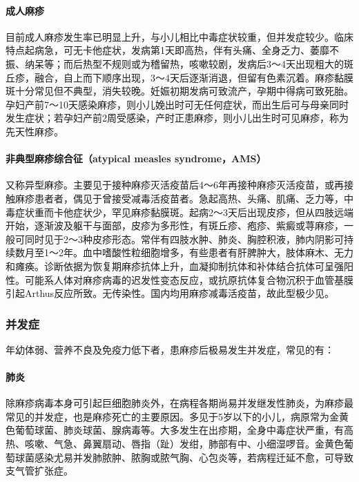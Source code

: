 \paragraph{成人麻疹}

目前成人麻疹发生率已明显上升，与小儿相比中毒症状较重，但并发症较少。临床特点起病急，可无卡他症状，发病第1天即高热，伴有头痛、全身乏力、萎靡不振、纳呆等；而后热型不规则或为稽留热，咳嗽较剧，发病后3～4天出现粗大的斑丘疹，融合，自上而下顺序出现，3～4天后逐渐消退，但留有色素沉着。麻疹黏膜斑十分常见但不典型，消失较晚。妊娠初期发病可致流产，孕期中得病可致死胎。孕妇产前7～10天感染麻疹，则小儿娩出时可无任何症状，而出生后可与母亲同时发生症状；若孕妇产前2周受感染，产时正患麻疹，则小儿出生时可见麻疹，称为先天性麻疹。

\paragraph{非典型麻疹综合征（atypical measles syndrome，AMS）}

又称异型麻疹。主要见于接种麻疹灭活疫苗后4～6年再接种麻疹灭活疫苗，或再接触麻疹患者者，偶见于曾接受减毒活疫苗者。急起高热、头痛、肌痛、乏力等，中毒症状重而卡他症状少，罕见麻疹黏膜斑。起病2～3天后出现皮疹，但从四肢远端开始，逐渐波及躯干与面部，皮疹为多形性，有斑丘疹、疱疹、紫癜或荨麻疹，一般可同时见于2～3种皮疹形态。常伴有四肢水肿、肺炎、胸腔积液，肺内阴影可持续数月至1～2年。血中嗜酸性粒细胞增多，有些患者有肝脾肿大，肢体麻木、无力和瘫痪。诊断依据为恢复期麻疹抗体上升，血凝抑制抗体和补体结合抗体可呈强阳性。可能系人体对麻疹病毒的迟发性变态反应，或抗原抗体复合物沉积于血管基膜引起Arthus反应所致。无传染性。国内均用麻疹减毒活疫苗，故此型极少见。

\subsubsection{并发症}

年幼体弱、营养不良及免疫力低下者，患麻疹后极易发生并发症，常见的有：

\paragraph{肺炎}

除麻疹病毒本身可引起巨细胞肺炎外，在病程各期尚易并发继发性肺炎，为麻疹最常见的并发症，也是麻疹死亡的主要原因。多见于5岁以下的小儿，病原常为金黄色葡萄球菌、肺炎球菌、腺病毒等。大多发生在出疹期，全身中毒症状严重，有高热、咳嗽、气急、鼻翼扇动、唇指（趾）发绀，肺部有中、小细湿啰音。金黄色葡萄球菌感染尤易并发肺脓肿、脓胸或脓气胸、心包炎等，若病程迁延不愈，可导致支气管扩张症。

